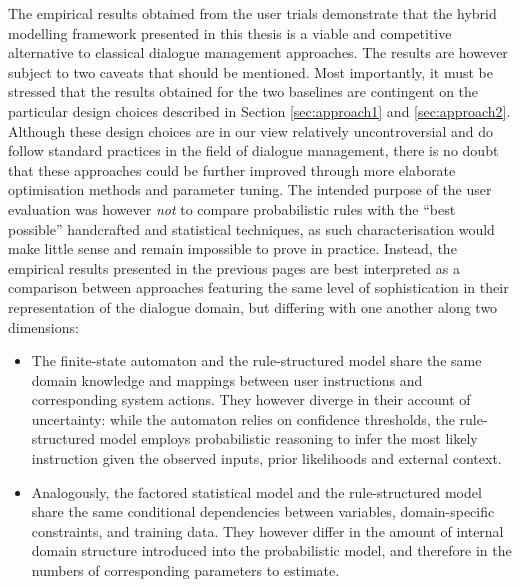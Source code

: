 The empirical results obtained from the user trials demonstrate that the hybrid modelling framework presented in this thesis is a viable and competitive alternative to classical dialogue management approaches.  The results are however subject to two caveats that should be mentioned.  Most importantly, it must be stressed that the results obtained for the two baselines are contingent on the particular design choices described in Section \ref{sec:approach1} and \ref{sec:approach2}.  Although these design choices are in our view relatively uncontroversial and do follow standard practices in the field of dialogue management, there is no doubt that these approaches could be further improved through more elaborate optimisation methods and parameter tuning. The intended purpose of the user evaluation was however \textit{not} to compare probabilistic rules with the ``best possible'' handcrafted and statistical techniques, as such characterisation would make little sense and remain impossible to prove in practice. Instead, the empirical results presented in the previous pages are best interpreted as a comparison between approaches featuring the same level of sophistication in their representation of the dialogue domain, but differing with one another along two dimensions:
\begin{itemize}
\item The finite-state automaton and the rule-structured model share the same domain knowledge and mappings between user instructions and corresponding system actions.  They however diverge in their account of uncertainty: while the automaton relies on confidence thresholds, the rule-structured model employs probabilistic reasoning to infer the most likely instruction given the observed inputs, prior likelihoods and external context.
\item Analogously, the factored statistical model and the rule-structured model share the same conditional dependencies between variables, domain-specific constraints, and training data. They however differ in the amount of internal domain structure introduced into the probabilistic model, and therefore in the numbers of corresponding parameters to estimate.
\end{itemize}

